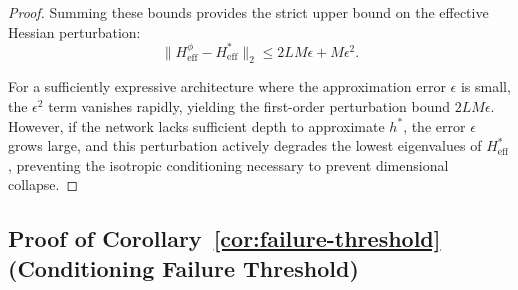 \documentclass{article}
\theoremstyle{plain}
\theoremstyle{definition}
\theoremstyle{remark}
\begin{document}
\begin{proof}
Summing these bounds provides the strict upper bound on the effective Hessian perturbation:
\begin{equation*}
    \| H_{\text{eff}}^\phi - H_{\text{eff}}^* \|_2 \le 2 L M \epsilon + M \epsilon^2.
\end{equation*}

For a sufficiently expressive architecture where the approximation error $\epsilon$ is small, the $\epsilon^2$ term vanishes rapidly, yielding the first-order perturbation bound $2LM\epsilon$. However, if the network lacks sufficient depth to approximate $h^*$, the error $\epsilon$ grows large, and this perturbation actively degrades the lowest eigenvalues of $H_{\text{eff}}^*$, preventing the isotropic conditioning necessary to prevent dimensional collapse.
\end{proof}

\subsection{Proof of Corollary~\ref{cor:failure-threshold} (Conditioning Failure Threshold)}
\label{proof:cor-failure}
\end{document}
